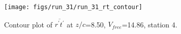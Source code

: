 \begin{figure}[H]
\centering
\texttt{[image: figs/run\_31/run\_31\_rt\_contour]}
\caption{Contour plot of $\overline{r^\prime t^\prime}$ at $z/c$=8.50, $V_{free}$=14.86, station 4.}
\label{fig:run_31_rt_contour}
\end{figure}


